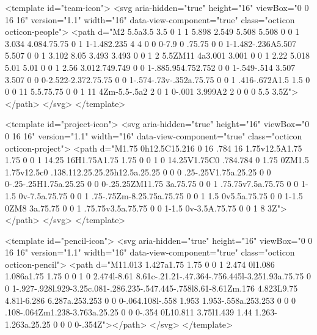 {{<template id="team-icon">
  <svg aria-hidden="true" height="16" viewBox="0 0 16 16" version="1.1" width="16" data-view-component="true" class="octicon octicon-people">
    <path d="M2 5.5a3.5 3.5 0 1 1 5.898 2.549 5.508 5.508 0 0 1 3.034 4.084.75.75 0 1 1-1.482.235 4 4 0 0 0-7.9 0 .75.75 0 0 1-1.482-.236A5.507 5.507 0 0 1 3.102 8.05 3.493 3.493 0 0 1 2 5.5ZM11 4a3.001 3.001 0 0 1 2.22 5.018 5.01 5.01 0 0 1 2.56 3.012.749.749 0 0 1-.885.954.752.752 0 0 1-.549-.514 3.507 3.507 0 0 0-2.522-2.372.75.75 0 0 1-.574-.73v-.352a.75.75 0 0 1 .416-.672A1.5 1.5 0 0 0 11 5.5.75.75 0 0 1 11 4Zm-5.5-.5a2 2 0 1 0-.001 3.999A2 2 0 0 0 5.5 3.5Z"></path>
</svg>
</template>

<template id="project-icon">
  <svg aria-hidden="true" height="16" viewBox="0 0 16 16" version="1.1" width="16" data-view-component="true" class="octicon octicon-project">
    <path d="M1.75 0h12.5C15.216 0 16 .784 16 1.75v12.5A1.75 1.75 0 0 1 14.25 16H1.75A1.75 1.75 0 0 1 0 14.25V1.75C0 .784.784 0 1.75 0ZM1.5 1.75v12.5c0 .138.112.25.25.25h12.5a.25.25 0 0 0 .25-.25V1.75a.25.25 0 0 0-.25-.25H1.75a.25.25 0 0 0-.25.25ZM11.75 3a.75.75 0 0 1 .75.75v7.5a.75.75 0 0 1-1.5 0v-7.5a.75.75 0 0 1 .75-.75Zm-8.25.75a.75.75 0 0 1 1.5 0v5.5a.75.75 0 0 1-1.5 0ZM8 3a.75.75 0 0 1 .75.75v3.5a.75.75 0 0 1-1.5 0v-3.5A.75.75 0 0 1 8 3Z"></path>
</svg>
</template>

<template id="pencil-icon">
  <svg aria-hidden="true" height="16" viewBox="0 0 16 16" version="1.1" width="16" data-view-component="true" class="octicon octicon-pencil">
    <path d="M11.013 1.427a1.75 1.75 0 0 1 2.474 0l1.086 1.086a1.75 1.75 0 0 1 0 2.474l-8.61 8.61c-.21.21-.47.364-.756.445l-3.251.93a.75.75 0 0 1-.927-.928l.929-3.25c.081-.286.235-.547.445-.758l8.61-8.61Zm.176 4.823L9.75 4.81l-6.286 6.287a.253.253 0 0 0-.064.108l-.558 1.953 1.953-.558a.253.253 0 0 0 .108-.064Zm1.238-3.763a.25.25 0 0 0-.354 0L10.811 3.75l1.439 1.44 1.263-1.263a.25.25 0 0 0 0-.354Z"></path>
</svg>
</template>

}}

